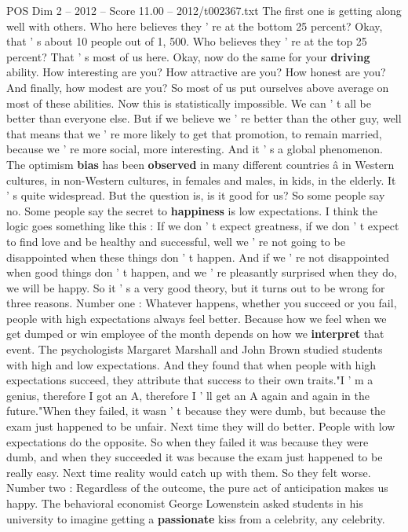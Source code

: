 \begin{textsample}{POS Dim 2 – 2012 – Score 11.00 – 2012/t002367.txt}
The first one is getting along well with others.
Who here believes they ' re at the bottom 25 percent?
Okay, that ' s about 10 people out of 1, 500.
Who believes they ' re at the top 25 percent?
That ' s most of us here.
Okay, now do the same for your \textbf{driving} ability.
How interesting are you?
How attractive are you?
How honest are you?
And finally, how modest are you?
So most of us put ourselves above average on most of these abilities.
Now this is statistically impossible.
We can ' t all be better than everyone else.
But if we believe we ' re better than the other guy, well that means that we ' re more likely to get that promotion, to remain married, because we ' re more social, more interesting.
And it ' s a global phenomenon.
The optimism \textbf{bias} has been \textbf{observed} in many different countries â in Western cultures, in non-Western cultures, in females and males, in kids, in the elderly.
It ' s quite widespread.
But the question is, is it good for us?
So some people say no.
Some people say the secret to \textbf{happiness} is low expectations.
I think the logic goes something like this : If we don ' t expect greatness, if we don ' t expect to find love and be healthy and successful, well we ' re not going to be disappointed when these things don ' t happen.
And if we ' re not disappointed when good things don ' t happen, and we ' re pleasantly surprised when they do, we will be happy.
So it ' s a very good theory, but it turns out to be wrong for three reasons.
Number one : Whatever happens, whether you succeed or you fail, people with high expectations always feel better.
Because how we feel when we get dumped or win employee of the month depends on how we \textbf{interpret} that event.
The psychologists Margaret Marshall and John Brown studied students with high and low expectations.
And they found that when people with high expectations succeed, they attribute that success to their own traits."I ' m a genius, therefore I got an A, therefore I ' ll get an A again and again in the future."When they failed, it wasn ' t because they were dumb, but because the exam just happened to be unfair.
Next time they will do better.
People with low expectations do the opposite.
So when they failed it was because they were dumb, and when they succeeded it was because the exam just happened to be really easy.
Next time reality would catch up with them.
So they felt worse.
Number two : Regardless of the outcome, the pure act of anticipation makes us happy.
The behavioral economist George Lowenstein asked students in his university to imagine getting a \textbf{passionate} kiss from a celebrity, any celebrity.

\end{textsample}
